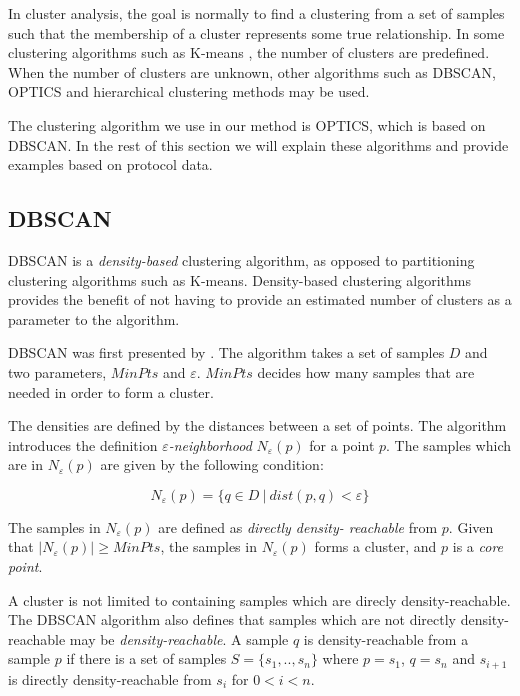 \documentclass[a4paper]{report}
\begin{document}
In cluster analysis, the goal is normally to find a clustering from a
set of samples such that the membership of a cluster represents some true
relationship. In some clustering algorithms such as K-means \citep{macqueen67},
the number of clusters are predefined. When the number of clusters are unknown,
other algorithms such as DBSCAN, OPTICS and hierarchical clustering methods may
be used.

The clustering algorithm we use in our method is OPTICS, which is based on
DBSCAN. In the rest of this section we will explain these algorithms and
provide examples based on protocol data.

\subsection{DBSCAN}
DBSCAN is a \emph{density-based} clustering algorithm, as opposed to
partitioning clustering algorithms such as K-means. Density-based clustering 
algorithms provides the benefit of not having to provide an estimated number 
of clusters as a parameter to the algorithm.

DBSCAN was first presented by \citet{ester96}. The algorithm takes a set of 
samples $D$ and two parameters, $MinPts$ and $\varepsilon$. $MinPts$ decides
how many samples that are needed in order to form a cluster.

The densities are defined by the distances between a set of points.
The algorithm introduces the definition \emph{$\varepsilon$-neighborhood}
$N_{\varepsilon}(p)$ for a point $p$. The samples which are in 
$N_{\varepsilon}(p)$ are given by the following condition:

\begin{equation}
    N_{\varepsilon}(p) = \{ q \in D ~|~ dist(p,q) < \varepsilon  \}
    \label{eq:eps}
\end{equation}

The samples in $N_{\varepsilon}(p)$ are defined as \emph{directly density-
reachable} from $p$. Given that $|N_{\varepsilon}(p)| \ge MinPts$, the samples
in $N_{\varepsilon}(p)$ forms a cluster, and $p$ is a \emph{core point}. 

A cluster is not limited to containing samples which are direcly
density-reachable. The DBSCAN algorithm also defines that samples which are
not directly density-reachable may be \emph{density-reachable}.
A sample $q$ is density-reachable from a sample $p$ if there is a set of samples
$S = \{s_1, .., s_n\}$ where $p = s_1$, $q = s_n$ and $s_{i+1}$ is directly
density-reachable from $s_i$ for $0 < i < n$.
\end{document}
